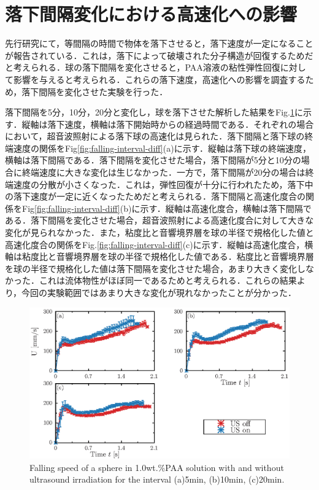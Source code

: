 \section{落下間隔変化における高速化への影響}
先行研究\cite{ref:8-5}にて，等間隔の時間で物体を落下させると，落下速度が一定になることが報告されている．これは，落下によって破壊された分子構造が回復するためだと考えられる．球の落下間隔を変化させると，PAA溶液の粘性弾性回復に対して影響を与えると考えられる．これらの落下速度，高速化への影響を調査するため，落下間隔を変化させた実験を行った．

落下間隔を5分，10分，20分と変化し，球を落下させた解析した結果をFig.\ref{fig:falling-interval}に示す．縦軸は落下速度，横軸は落下開始時からの経過時間である．それぞれの場合において，超音波照射による落下球の高速化は見られた．落下間隔と落下球の終端速度の関係をFig\ref{fig:falling-interval-diff}(a)に示す．縦軸は落下球の終端速度，横軸は落下間隔である．落下間隔を変化させた場合，落下間隔が5分と10分の場合に終端速度に大きな変化は生じなかった．一方で，落下間隔が20分の場合は終端速度の分散が小さくなった．これは，弾性回復が十分に行われたため，落下中の落下速度が一定に近くなったためだと考えられる．落下間隔と高速化度合の関係をFig\ref{fig:falling-interval-diff}(b)に示す．縦軸は高速化度合，横軸は落下間隔である．落下間隔を変化させた場合，超音波照射による高速化度合に対して大きな変化が見られなかった．また，粘度比と音響境界層を球の半径で規格化した値と高速化度合の関係をFig.\ref{fig:falling-interval-diff}(c)に示す．縦軸は高速化度合，横軸は粘度比と音響境界層を球の半径で規格化した値である．粘度比と音響境界層を球の半径で規格化した値は落下間隔を変化させた場合，あまり大きく変化しなかった．これは流体物性がほぼ同一であるためと考えられる．これらの結果より，今回の実験範囲ではあまり大きな変化が現れなかったことが分かった．
\begin{figure}[H]
    \centering
    \includegraphics[width=1\textwidth]{./X-Appendix/interval/interval.eps}
    \caption{Falling speed of a sphere in 1.0wt.\%PAA solution with and without ultrasound irradiation for the interval (a)5min, (b)10min, (c)20min.}
    \label{fig:falling-interval}
\end{figure}

